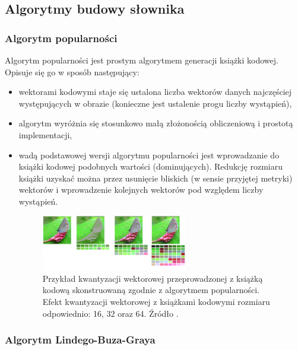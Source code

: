 \documentclass{article}
\begin{document}
\subsection{Algorytmy budowy słownika}

\subsubsection{Algorytm popularności}

Algorytm popularności jest prostym algorytmem generacji książki kodowej. Opisuje się go w sposób następujący:

\begin{itemize}
  \item wektorami kodowymi staje się ustalona liczba wektorów danych najczęściej występujących
        w obrazie (konieczne jest ustalenie progu liczby wystąpień),
  \item algorytm wyróżnia się stosunkowo małą złożonością obliczeniową i prostotą implementacji,
  \item wadą podstawowej wersji algorytmu popularności jest wprowadzanie do książki kodowej podobnych wartości (dominujących).
        Redukcję rozmiaru książki uzyskać można przez usunięcie bliskich (w sensie przyjętej metryki) wektorów i 
        wprowadzenie kolejnych wektorów pod względem liczby wystąpień.
        
        \begin{figure}[H]
          \centering
          \includegraphics[width=0.6\textwidth]{images/motyle_2.png}
          \caption{Przykład kwantyzacji wektorowej przeprowadzonej z książką kodową skonstruowaną zgodnie z algorytmem popularności.
            Efekt kwantyzacji wektorowej z książkami kodowymi rozmiaru odpowiednio: 16, 32 oraz 64. Źródło \cite{aprzelaskowski}.}
          \label{fig:motyle_2}
        \end{figure}
        
\end{itemize}

\subsubsection{Algorytm Lindego-Buza-Graya}
\end{document}
